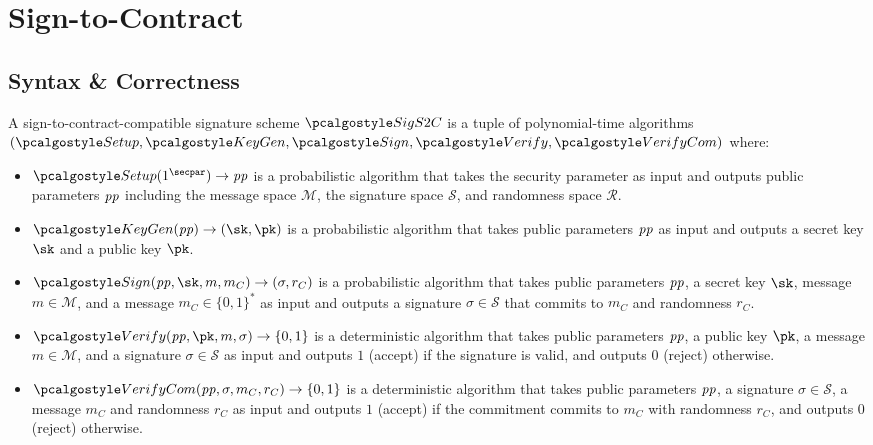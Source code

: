 \section{Sign-to-Contract}

\subsection{Syntax \& Correctness}

\begin{definition}
  A sign-to-contract-compatible signature scheme $\algo{SigS2C}$ is a tuple of polynomial-time algorithms $(\algo{Setup}, \algo{KeyGen}, \algo{Sign}, \algo{Verify}, \algo{VerifyCom})$ where:
  \begin{itemize}
    \item $\algo{Setup}(1^\secpar) \rightarrow \params$ is a probabilistic algorithm that takes the security parameter as input and outputs public parameters $\mathit{pp}$ including the message space $\mathcal{M}$, the signature space $\mathcal{S}$, and randomness space $\mathcal{R}$.
    \item $\algo{KeyGen}(\params) \rightarrow (\sk, \pk)$ is a probabilistic algorithm that takes public parameters $\mathit{pp}$ as input and outputs a secret key $\sk$ and a public key $\pk$.
    \item $\algo{Sign}(\params, \sk, m, m_C) \rightarrow (\sigma, r_C)$ is a probabilistic algorithm that takes public parameters $\mathit{pp}$, a secret key $\sk$, message $m \in \mathcal{M}$, and a message $m_C \in \{0, 1\}^*$ as input and outputs a signature $\sigma \in \mathcal{S}$ that commits to $m_C$ and randomness $r_C$.
    \item $\algo{Verify}(\params, \pk, m, \sigma) \rightarrow \{0, 1\}$ is a deterministic algorithm that takes public parameters $\mathit{pp}$, a public key $\pk$, a message $m \in \mathcal{M}$, and a signature $\sigma \in \mathcal{S}$ as input and outputs $1$ (accept) if the signature is valid, and outputs $0$ (reject) otherwise.
    \item $\algo{VerifyCom}(\params, \sigma, m_C, r_C) \rightarrow \{0, 1\}$ is a deterministic algorithm that takes public parameters $\mathit{pp}$, a signature $\sigma \in \mathcal{S}$, a message $m_C$ and randomness $r_C$ as input and outputs $1$ (accept) if the commitment commits to $m_C$ with randomness $r_C$, and outputs $0$ (reject) otherwise.
  \end{itemize}
\end{definition}

